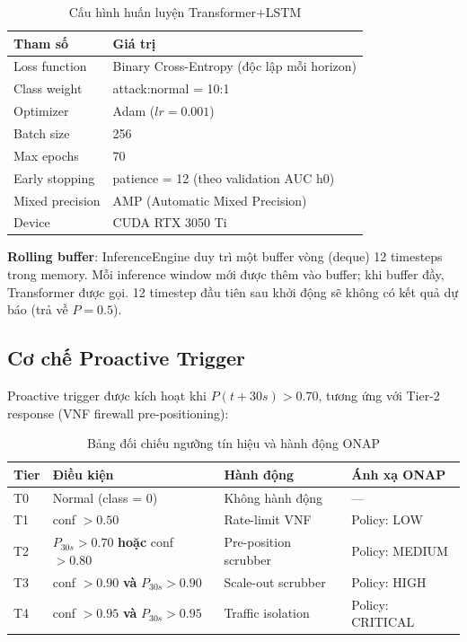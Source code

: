 \documentclass[12pt,a4paper]{article}
\begin{document}
\begin{table}[H]
\centering
\caption{Cấu hình huấn luyện Transformer+LSTM}
\label{tab:tf_config}
\begin{tabular}{ll}
\toprule
\textbf{Tham số} & \textbf{Giá trị} \\
\midrule
Loss function     & Binary Cross-Entropy (độc lập mỗi horizon) \\
Class weight      & attack:normal = 10:1 \\
Optimizer         & Adam ($lr = 0.001$) \\
Batch size        & 256 \\
Max epochs        & 70 \\
Early stopping    & patience = 12 (theo validation AUC h0) \\
Mixed precision   & AMP (Automatic Mixed Precision) \\
Device            & CUDA RTX 3050 Ti \\
\bottomrule
\end{tabular}
\end{table}

\textbf{Rolling buffer}: InferenceEngine duy trì một buffer vòng (deque) 12 timesteps trong memory. Mỗi inference window mới được thêm vào buffer; khi buffer đầy, Transformer được gọi. 12 timestep đầu tiên sau khởi động sẽ không có kết quả dự báo (trả về $P = 0.5$).

\subsection{Cơ chế Proactive Trigger}

Proactive trigger được kích hoạt khi $P(t+30s) > 0.70$, tương ứng với Tier-2 response (VNF firewall pre-positioning):

\begin{table}[H]
\centering
\caption{Bảng đối chiếu ngưỡng tín hiệu và hành động ONAP}
\label{tab:tiers}
\begin{tabular}{llp{5cm}p{3.5cm}}
\toprule
\textbf{Tier} & \textbf{Điều kiện} & \textbf{Hành động} & \textbf{Ánh xạ ONAP} \\
\midrule
T0 & Normal (class = 0)                              & Không hành động        & --- \\
T1 & conf $> 0.50$                                   & Rate-limit VNF         & Policy: LOW \\
T2 & $P_{30s} > 0.70$ \textbf{hoặc} conf $> 0.80$  & Pre-position scrubber  & Policy: MEDIUM \\
T3 & conf $> 0.90$ \textbf{và} $P_{30s} > 0.90$    & Scale-out scrubber     & Policy: HIGH \\
T4 & conf $> 0.95$ \textbf{và} $P_{30s} > 0.95$    & Traffic isolation      & Policy: CRITICAL \\
\bottomrule
\end{tabular}
\end{table}
\end{document}
